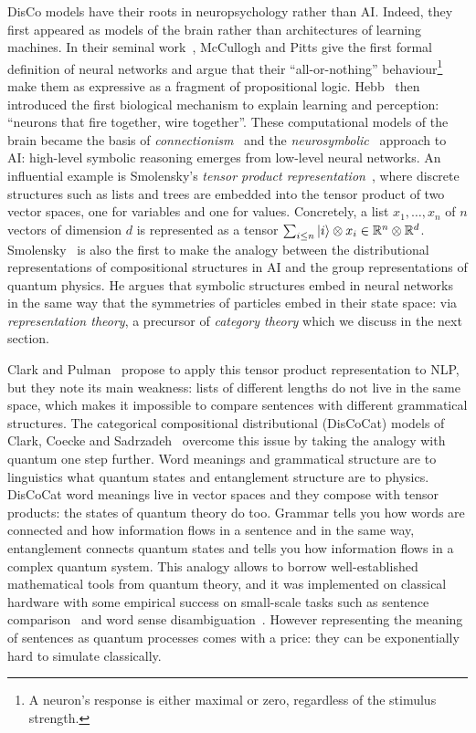 DisCo models have their roots in neuropsychology rather than AI.
Indeed, they first appeared as models of the brain rather than architectures of learning machines.
In their seminal work~\cite{McCullochPitts43}, McCullogh and Pitts give the first formal definition of neural networks and argue that their ``all-or-nothing'' behaviour\footnote
{A neuron's response is either maximal or zero, regardless of the stimulus strength.}
make them as expressive as a fragment of propositional logic.
Hebb~\cite{Hebb49} then introduced the first biological mechanism to explain learning and perception: ``neurons that fire together, wire together''.
These computational models of the brain became the basis of \emph{connectionism}~\cite{Smolensky87,Smolensky88} and the \emph{neurosymbolic}~\cite{Hilario97} approach to AI: high-level symbolic reasoning emerges from low-level neural networks.
An influential example is Smolensky's \emph{tensor product representation}~\cite{Smolensky90}, where discrete structures such as lists and trees are embedded into the tensor product of two vector spaces, one for variables and one for values.
Concretely, a list $x_1, \dots, x_n$ of $n$ vectors of dimension $d$ is represented as a tensor $\sum_{i \leq n} |i\rangle \otimes x_i \in \mathbb{R}^n \otimes \mathbb{R}^d$.
Smolensky~\cite{Smolensky90} is also the first to make the analogy between the distributional representations of compositional structures in AI and the group representations of quantum physics.
He argues that symbolic structures embed in neural networks in the same way that the symmetries of particles embed in their state space: via \emph{representation theory}, a precursor of \emph{category theory} which we discuss in the next section.

Clark and Pulman~\cite{ClarkPulman07} propose to apply this tensor product representation to NLP, but they note its main weakness: lists of different lengths do not live in the same space, which makes it impossible to compare sentences with different grammatical structures.
The categorical compositional distributional (DisCoCat) models of Clark, Coecke and Sadrzadeh~\cite{ClarkEtAl08,ClarkEtAl10} overcome this issue by taking the analogy with quantum one step further.
Word meanings and grammatical structure are to linguistics what quantum states and entanglement structure are to physics.
DisCoCat word meanings live in vector spaces and they compose with tensor products: the states of quantum theory do too.
Grammar tells you how words are connected and how information flows in a sentence and in the same way, entanglement connects quantum states and tells you how information flows in a complex quantum system.
This analogy allows to borrow well-established mathematical tools from quantum theory, and it was implemented on classical hardware with some empirical success on small-scale tasks such as sentence comparison~\cite{GrefenstetteEtAl10} and word sense disambiguation~\cite{GrefenstetteSadrzadeh11,KartsaklisEtAl13}.
However representing the meaning of sentences as quantum processes comes with a price: they can be exponentially hard to simulate classically.

